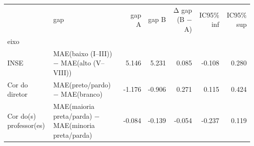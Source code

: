\begin{tabular}{llrrrrr}
\toprule
 & gap & gap A & gap B & Δ gap (B − A) & IC95\% inf & IC95\% sup \\
eixo &  &  &  &  &  &  \\
\midrule
INSE & MAE(baixo (I–III)) − MAE(alto (V–VIII)) & 5.146 & 5.231 & 0.085 & -0.108 & 0.280 \\
Cor do diretor & MAE(preto/pardo) − MAE(branco) & -1.176 & -0.906 & 0.271 & 0.115 & 0.424 \\
Cor do(s) professor(es) & MAE(maioria preta/parda) − MAE(minoria preta/parda) & -0.084 & -0.139 & -0.054 & -0.237 & 0.119 \\
\bottomrule
\end{tabular}
